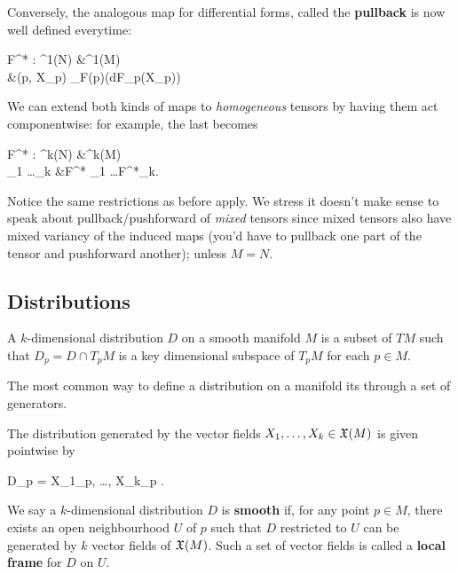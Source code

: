 \documentclass[main.tex]{subfiles}
\begin{document}
\begin{construction}
\label{const:pullback}
	Conversely, the analogous map for differential forms, called the \textbf{pullback} is now well defined everytime:
	\begin{eqalign}
		F^* : \Omega^1(N) &\longto \Omega^1(M)\\
		\omega &\longmapsto (p, X_p) \mapsto \omega_{F(p)}(dF_p(X_p))
	\end{eqalign}
\end{construction}

\begin{construction}
\label{const:pb_and_pf_of_tensors}
	We can extend both kinds of maps to \emph{homogeneous} tensors by having them act componentwise: for example, the last becomes
	\begin{eqalign}
		F^* : \Omega^k(N) &\longto \Omega^k(M)\\
		\omega_1 \wedge \ldots \wedge \omega_k &\longmapsto F^* \omega_1 \wedge \ldots \wedge F^*\omega_k.
	\end{eqalign}
	Notice the same restrictions as before apply. We stress it doesn't make sense to speak about pullback/pushforward of \emph{mixed} tensors since mixed tensors also have mixed variancy of the induced maps (you'd have to pullback one part of the tensor and pushforward another); unless $M=N$.
\end{construction}

\subsection{Distributions}
\begin{definition}
	A $k$-dimensional distribution $D$ on a smooth manifold $M$ is a subset of $TM$ such that $D_p = D \cap T_pM$ is a key dimensional subspace of $T_pM$ for each $p\in M$.
\end{definition}

The most common way to define a distribution on a manifold its through a set of generators.

\begin{definition}
	The distribution generated by the vector fields $X_1, \ldots, X_k \in \mathfrak{X}(M)$ is given pointwise by
	\begin{eqalign}
		D_p = \langle X_1\vert_p, \ldots, X_k\vert_p \rangle.
	\end{eqalign}
\end{definition}

\begin{definition}
	We say a $k$-dimensional distribution $D$ is \textbf{smooth} if, for any point $p \in M$, there exists an open neighbourhood $U$ of $p$ such that $D$ restricted to $U$ can be generated by $k$ vector fields of $\mathfrak{X}(M)$. Such a set of vector fields is called a \textbf{local frame} for $D$ on $U$.
\end{definition}
\end{document}
